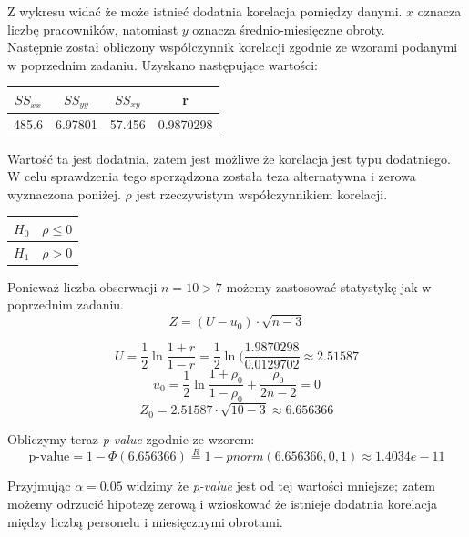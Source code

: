 \documentclass{article}
\begin{document}
Z wykresu widać że może istnieć dodatnia korelacja pomiędzy danymi. $x$ oznacza liczbę pracowników, natomiast $y$ oznacza średnio-miesięczne obroty. \\
Następnie został obliczony współczynnik korelacji zgodnie ze wzorami podanymi w poprzednim zadaniu. Uzyskano następujące wartości:
\begin{center} \begin{tabular}{|c|c|c|c|} \hline
$SS_{xx}$ & $SS_{yy}$ & $SS_{xy}$ & r \\ \hline
485.6 & 6.97801 & 57.456 & 0.9870298 \\ \hline
\end{tabular} \end{center}

Wartość ta jest dodatnia, zatem jest możliwe że korelacja jest typu dodatniego. W celu sprawdzenia tego sporządzona została teza alternatywna i zerowa wyznaczona poniżej. $\rho$ jest rzeczywistym współczynnikiem korelacji.
\begin{center} \begin{tabular}{|c|c|} \hline
$H_0$ & $\rho \leq 0$ \\ \hline
$H_1$ & $\rho > 0$ \\ \hline
\end{tabular} \end{center}

Ponieważ liczba obserwacji $n = 10 > 7$ możemy zastosować statystykę jak w poprzednim zadaniu.
\[ Z = (U - u_0) \cdot \sqrt{n-3} \]

\[U = \frac{1}{2} \ln \frac{1+r}{1-r} = \frac{1}{2} \ln(\frac{1.9870298}{0.0129702} \approx 2.51587 \]
\[ u_0 = \frac{1}{2} \ln \frac{1+\rho_0}{1-\rho_0} + \frac{\rho_0}{2n-2} = 0 \]
\[ Z_0 = 2.51587 \cdot \sqrt{10 -3} \approx 6.656366 \]

Obliczymy teraz \textit{p-value} zgodnie ze wzorem:
\[ \text{p-value} = 1 - \Phi(6.656366) \overset{R}{=} 1 - pnorm(6.656366, 0, 1) \approx 1.4034e-11 \]

Przyjmując $\alpha = 0.05$ widzimy że \textit{p-value} jest od tej wartości mniejsze; zatem możemy odrzucić hipotezę zerową i wzioskować że istnieje dodatnia korelacja między liczbą personelu i miesięcznymi obrotami.
\end{document}
